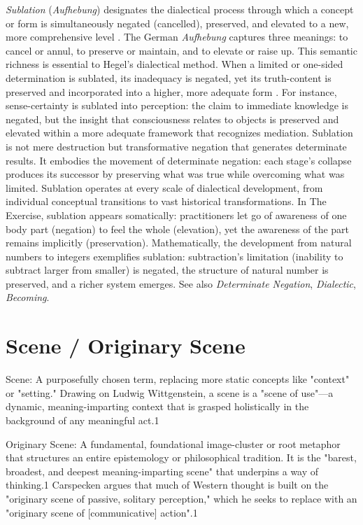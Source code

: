 \documentclass{book}
\begin{document}
\textit{Sublation} (\textit{Aufhebung}) designates the dialectical process through which a concept or form is simultaneously negated (cancelled), preserved, and elevated to a new, more comprehensive level \parencite{hegel1977phenomenology, hegel_georg_2010}. The German \textit{Aufhebung} captures three meanings: to cancel or annul, to preserve or maintain, and to elevate or raise up. This semantic richness is essential to Hegel's dialectical method. When a limited or one-sided determination is sublated, its inadequacy is negated, yet its truth-content is preserved and incorporated into a higher, more adequate form \parencite{hegel1977phenomenology}. For instance, sense-certainty is sublated into perception: the claim to immediate knowledge is negated, but the insight that consciousness relates to objects is preserved and elevated within a more adequate framework that recognizes mediation. Sublation is not mere destruction but transformative negation that generates determinate results. It embodies the movement of determinate negation: each stage's collapse produces its successor by preserving what was true while overcoming what was limited. Sublation operates at every scale of dialectical development, from individual conceptual transitions to vast historical transformations. In The Exercise, sublation appears somatically: practitioners let go of awareness of one body part (negation) to feel the whole (elevation), yet the awareness of the part remains implicitly (preservation). Mathematically, the development from natural numbers to integers exemplifies sublation: subtraction's limitation (inability to subtract larger from smaller) is negated, the structure of natural number is preserved, and a richer system emerges. See also \textit{Determinate Negation}, \textit{Dialectic}, \textit{Becoming}.


\section{Scene / Originary Scene}

\textit{}

Scene: A purposefully chosen term, replacing more static concepts like "context" or "setting." Drawing on Ludwig Wittgenstein, a scene is a "scene of use"—a dynamic, meaning-imparting context that is grasped holistically in the background of any meaningful act.1

Originary Scene: A fundamental, foundational image-cluster or root metaphor that structures an entire epistemology or philosophical tradition. It is the "barest, broadest, and deepest meaning-imparting scene" that underpins a way of thinking.1 Carspecken argues that much of Western thought is built on the "originary scene of passive, solitary perception," which he seeks to replace with an "originary scene of [communicative] action".1
\end{document}
